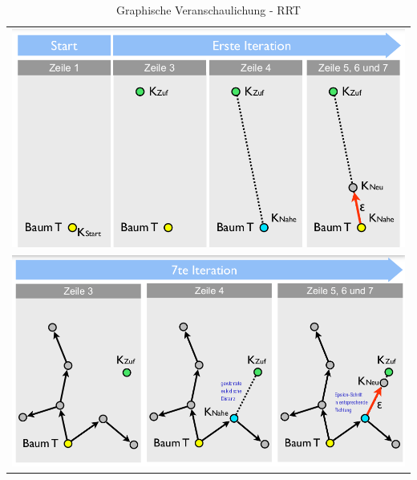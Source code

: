 \begin{center}
\begin{table}[hbt]
\begin{tabular}{p{10cm}}
\centering
\includegraphics[width=1.5\linewidth]{figures/ch04_rrt1.png}\\
\includegraphics[width=1.5\linewidth]{figures/ch04_rrt2.png}
\end{tabular}
\caption{Graphische Veranschaulichung - RRT}
\label{tab:rrt}
\end{table}
\end{center}

